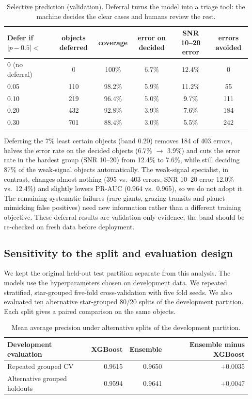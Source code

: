 \documentclass[11pt,a4paper]{article}
\begin{document}
\begin{table}[H]\centering\footnotesize\setlength{\tabcolsep}{3pt}
\begin{tabular}{@{}lccccc@{}}\toprule
Defer if $|p-0.5|<$ & objects deferred & coverage & error on decided & SNR 10--20 error & errors avoided\\\midrule
0 (no deferral) & 0 & 100\% & 6.7\% & 12.4\% & 0\\
0.05 & 110 & 98.2\% & 5.9\% & 11.2\% & 55\\
0.10 & 219 & 96.4\% & 5.0\% & 9.7\% & 111\\
0.20 & 432 & 92.8\% & 3.9\% & 7.6\% & 184\\
0.30 & 701 & 88.4\% & 3.0\% & 5.5\% & 242\\\bottomrule
\end{tabular}
\caption{Selective prediction (validation). Deferral turns the model into a triage tool: the machine decides the clear cases and humans review the rest.}\label{tab:defer}
\end{table}
Deferring the 7\% least certain objects (band 0.20) removes 184 of 403 errors, halves the error rate on the decided objects (6.7\% $\to$ 3.9\%) and cuts the error rate in the hardest group (SNR 10--20) from 12.4\% to 7.6\%, while still deciding 87\% of the weak-signal objects automatically. The weak-signal specialist, in contrast, changes almost nothing (395 vs.\ 403 errors, SNR 10--20 error 12.0\% vs.\ 12.4\%) and slightly lowers PR-AUC (0.964 vs.\ 0.965), so we do not adopt it. The remaining systematic failures (rare giants, grazing transits and planet-mimicking false positives) need new information rather than a different training objective. These deferral results are validation-only evidence; the band should be re-checked on fresh data before deployment.

\subsection{Sensitivity to the split and evaluation design}\label{sec:sensitivity}
We kept the original held-out test partition separate from this analysis. The models use the hyperparameters chosen on development data. We repeated stratified, star-grouped five-fold cross-validation with five fold seeds. We also evaluated ten alternative star-grouped 80/20 splits of the development partition. Each split gives a paired comparison on the same objects.

\begin{table}[H]\centering\small
\begin{tabular}{@{}lrrr@{}}\toprule
Development evaluation & XGBoost & Ensemble & Ensemble minus XGBoost \\\midrule
Repeated grouped CV & 0.9615 & 0.9650 & +0.0035 \\
Alternative grouped holdouts & 0.9594 & 0.9641 & +0.0047 \\\bottomrule
\end{tabular}
\caption{Mean average precision under alternative splits of the development partition.}\label{tab:sensitivity}
\end{table}
\end{document}
